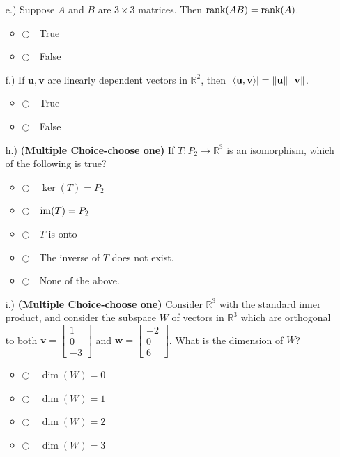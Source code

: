 \documentclass[12pt]{extarticle}
\newcommand{\chooseone}{{\Large$\Circle$\ \ }}
\begin{document}
\begin{enumerate}
\begin{itemize}

\item[e.) ] Suppose $A$ and $B$ are  $3\times 3$ matrices. Then $\operatorname{rank}(AB) = \operatorname{rank}(A)$.

\begin{itemize}[label={}]
\item \chooseone True
\item \chooseone False
\end{itemize}
\vspace{1.5cm}


\item[f.) ]If $\mathbf{u} , \mathbf{v}$ are linearly dependent vectors  in $\mathbb{R}^2$, then $\left| \langle {\mathbf{u}}, {\mathbf{v}}\rangle  \right| = \left\Vert {\mathbf{u}} \right\Vert \left\Vert{\mathbf{v}} \right\Vert$.


\begin{itemize}[label={}]
\item \chooseone True
\item \chooseone False
\end{itemize}
\vspace{1.5cm}

\item[h.) ] \textbf{(Multiple Choice-choose one)} If $T:P_2\to\mathbb{R}^3$ is an isomorphism, which of the following is true?

\begin{itemize}[label={}]
\item \chooseone $\ker(T) = P_2$ 
\item \chooseone $\operatorname{im}(T)=P_2$
\item \chooseone $T$ is onto
 \item \chooseone The inverse of $T$ does not exist.
\item \chooseone None of the above.
\end{itemize}
\vfill



\item[i.) ] \textbf{(Multiple Choice-choose one)} Consider $\mathbb{R}^3$ with the standard inner product, and consider the subspace $W$ of vectors in $\mathbb{R}^3$ which are orthogonal to both $\mathbf{v}=\begin{bmatrix} 1 \\ 0\\ -3\end{bmatrix}$ and $\mathbf{w}=\begin{bmatrix} -2 \\ 0\\ 6\end{bmatrix}$. What is the dimension of $W$?
\begin{itemize}[label={}]
\item \chooseone $\dim(W)=0$
\item \chooseone $\dim(W)=1$
\item \chooseone $\dim(W)=2$
\item \chooseone $\dim(W)=3$
\end{itemize}
\vfill




\end{itemize}
\end{enumerate}
\end{document}
